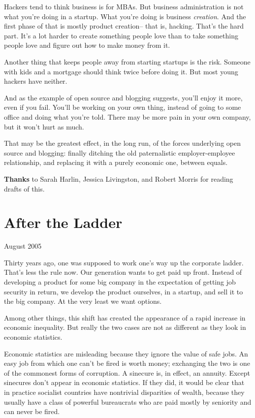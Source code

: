 \documentclass[12pt]{book}
\begin{document}
Hackers tend to think business is for MBAs. But business administration
is not what you're doing in a startup. What you're doing is business
\emph{creation}. And the first phase of that is mostly product
creation-- that is, hacking. That's the hard part. It's a lot harder to
create something people love than to take something people love and
figure out how to make money from it.

Another thing that keeps people away from starting startups is the risk.
Someone with kids and a mortgage should think twice before doing it. But
most young hackers have neither.

And as the example of open source and blogging suggests, you'll enjoy it
more, even if you fail. You'll be working on your own thing, instead of
going to some office and doing what you're told. There may be more pain
in your own company, but it won't hurt as much.

That may be the greatest effect, in the long run, of the forces
underlying open source and blogging: finally ditching the old
paternalistic employer-employee relationship, and replacing it with a
purely economic one, between equals.


\textbf{Thanks} to Sarah Harlin, Jessica Livingston, and Robert Morris
for reading drafts of this.
\chapter{After the Ladder}

August 2005

Thirty years ago, one was supposed to work one's way up the corporate
ladder. That's less the rule now. Our generation wants to get paid up
front. Instead of developing a product for some big company in the
expectation of getting job security in return, we develop the product
ourselves, in a startup, and sell it to the big company. At the very
least we want options.

Among other things, this shift has created the appearance of a rapid
increase in economic inequality. But really the two cases are not as
different as they look in economic statistics.

Economic statistics are misleading because they ignore the value of safe
jobs. An easy job from which one can't be fired is worth money;
exchanging the two is one of the commonest forms of corruption. A
sinecure is, in effect, an annuity. Except sinecures don't appear in
economic statistics. If they did, it would be clear that in practice
socialist countries have nontrivial disparities of wealth, because they
usually have a class of powerful bureaucrats who are paid mostly by
seniority and can never be fired.
\end{document}
